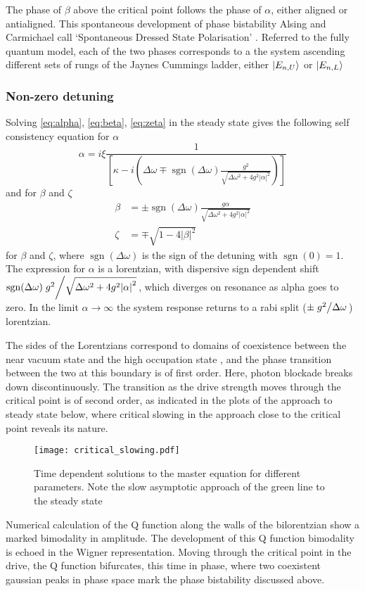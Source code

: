 The phase of $\beta$ above the critical point follows the phase of $\alpha$, either aligned or antialigned. This spontaneous development of phase bistability Alsing and Carmichael call `Spontaneous Dressed State Polarisation' \cite{Alsing1990}. Referred to the fully quantum model, each of the two phases corresponds to a the system ascending different sets of rungs of the Jaynes Cummings ladder, either $\ket{E_{n, U}}$ or $\ket{E_{n, L}}$
\subsubsection{Non-zero detuning}
Solving \cref{eq:alpha}, \cref{eq:beta}, \cref{eq:zeta} in the steady state gives the following self consistency equation for $\alpha$
\begin{equation}
  \alpha = i \xi\frac{1}{\left[\kappa-i\left(\Delta \omega \mp \operatorname{sgn}(\Delta \omega) \frac{g^2}{\sqrt{\Delta \omega^2 +4g^2 |\alpha|^2}}\right)\right]}
\end{equation}
and for $\beta$ and $\zeta$
\begin{align}
  \beta& = \pm \operatorname{sgn}(\Delta \omega) \frac{g \alpha}{\sqrt{\Delta \omega^2 + 4 g^2 |\alpha|^2}}\\
  \zeta& = \mp \sqrt{1-4|\beta|^2}
\end{align}
for $\beta$ and $\zeta$, where $\operatorname{sgn}(\Delta \omega)$ is the sign of the detuning with $\operatorname{sgn}(0) = 1$.
The expression for $\alpha$ is a lorentzian, with dispersive sign dependent shift $ \operatorname{sgn}(\Delta\omega)\flatfrac{g^2}{\sqrt{\Delta\omega^2+4g^2\abs{\alpha}^2}}$, which diverges on resonance as alpha goes to zero. 
In the limit $\alpha \rightarrow \infty$ the system response returns to a rabi split ($\pm\flatfrac{g^2}{\Delta\omega}$) lorentzian.

The sides of the Lorentzians correspond to domains of coexistence between the near vacuum state and the high occupation state \cite{Carmichael2015}, and the phase transition between the two at this boundary is of first order. 
Here, photon blockade breaks down discontinuously.
The transition as the drive strength moves through the critical point is of second order, as indicated in the plots of the approach to steady state below, where critical slowing in the approach close to the critical point reveals its nature.
\begin{figure}[!htb]
  \texttt{[image: critical\_slowing.pdf]}
  \caption{Time dependent solutions to the master equation for different parameters. Note the slow asymptotic approach of the green line to the steady state}
  \label{critical_slowing}
\end{figure}
Numerical calculation of the Q function along the walls of the bilorentzian show a marked bimodality in amplitude. The development of this Q function bimodality is echoed in the Wigner representation. Moving through the critical point in the drive, the Q function bifurcates, this time in phase, where two coexistent gaussian peaks in phase space mark the phase bistability discussed above.
